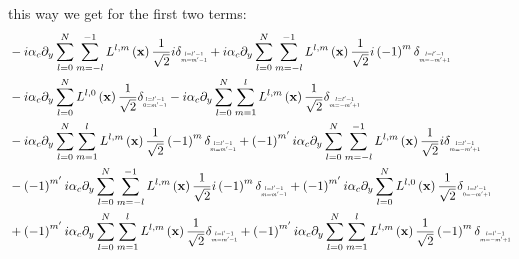 this way we get for the first two terms:
\begin{align*}
&-i\alpha_c\partial_y
\sum_{l=0}^{N}
\sum_{m=-l}^{-1}L^{l,m}\left (\vec{x}\right)
\frac{1}{\sqrt{2}}
i\delta_{\scaleto{\substack{l=l'-1\\m=m'-1}}{9pt}}
+i\alpha_c\partial_y
\sum_{l=0}^{N}
\sum_{m=-l}^{-1}L^{l,m}\left (\vec{x}\right)
\frac{1}{\sqrt{2}}
i
\left({-1}\right)^{m}
\delta_{\scaleto{\substack{l=l'-1\\m=-m'+1}}{9pt}}
\\&
-i\alpha_c\partial_y
\sum_{l=0}^{N}
L^{l,0}\left (\vec{x}\right)
\frac{1}{\sqrt{2}}
\delta_{\scaleto{\substack{l=l'-1\\0=m'-1}}{9pt}}
-i\alpha_c\partial_y
\sum_{l=0}^{N}
\sum_{m=1}^{l}L^{l,m}\left (\vec{x}\right)
\frac{1}{\sqrt{2}}
\delta_{\scaleto{\substack{l=l'-1\\m=-m'+1}}{9pt}}
\\&
-i\alpha_c\partial_y
\sum_{l=0}^{N}
\sum_{m=1}^{l}L^{l,m}\left (\vec{x}\right)
\frac{1}{\sqrt{2}}
\left({-1}\right)^{m}
\delta_{\scaleto{\substack{l=l'-1\\m=m'-1}}{9pt}}
+\left({-1}\right)^{m'}i\alpha_c\partial_y
\sum_{l=0}^{N}
\sum_{m=-l}^{-1}L^{l,m}\left (\vec{x}\right)
\frac{1}{\sqrt{2}}
i
\delta_{\scaleto{\substack{l=l'-1\\m=-m'+1}}{9pt}}
\\&
-\left({-1}\right)^{m'}i\alpha_c\partial_y
\sum_{l=0}^{N}
\sum_{m=-l}^{-1}L^{l,m}\left (\vec{x}\right)
\frac{1}{\sqrt{2}}
i
\left({-1}\right)^{m}
\delta_{\scaleto{\substack{l=l'-1\\m=m'-1}}{9pt}}
+
\left({-1}\right)^{m'}i\alpha_c\partial_y
\sum_{l=0}^{N}
L^{l,0}\left (\vec{x}\right)
\frac{1}{\sqrt{2}}
\delta_{\scaleto{\substack{l=l'-1\\0=-m'+1}}{9pt}}
\\&
+
\left({-1}\right)^{m'}i\alpha_c\partial_y
\sum_{l=0}^{N}
\sum_{m=1}^{l}L^{l,m}\left (\vec{x}\right)
\frac{1}{\sqrt{2}}
\delta_{\scaleto{\substack{l=l'-1\\m=m'-1}}{9pt}}
+
\left({-1}\right)^{m'}i\alpha_c\partial_y
\sum_{l=0}^{N}
\sum_{m=1}^{l}L^{l,m}\left (\vec{x}\right)
\frac{1}{\sqrt{2}}
\left({-1}\right)^{m}
\delta_{\scaleto{\substack{l=l'-1\\m=-m'+1}}{9pt}}
\end{align*}

